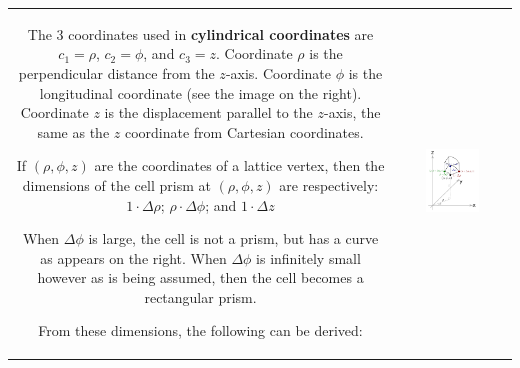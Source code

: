 \begin{tabular}{cc}
\parbox{0.5\textwidth}{
The 3 coordinates used in {\bf cylindrical coordinates} are \(c_1 = \rho\), \(c_2 = \phi\), and \(c_3 = z\). Coordinate \(\rho\) is the perpendicular distance from the \(z\)-axis. Coordinate \(\phi\) is the longitudinal coordinate (see the image on the right). Coordinate \(z\) is the displacement parallel to the \(z\)-axis, the same as the \(z\) coordinate from Cartesian coordinates. 

If \((\rho,\phi,z)\) are the coordinates of a lattice vertex, then the dimensions of the cell prism at \((\rho,\phi,z)\) are respectively:
\(1 \cdot \Delta\rho\); \(\rho \cdot \Delta\phi\); and \(1 \cdot \Delta z\)

When \(\Delta\phi\) is large, the cell is not a prism, but has a curve as appears on the right. When \(\Delta\phi\) is infinitely small however as is being assumed, then the cell becomes a rectangular prism.

From these dimensions, the following can be derived:
} & \parbox{0.5\textwidth}{
\includegraphics[width = 0.5\textwidth]{Coordinate_systems/cylindrical_coordinates}
}
\end{tabular}

